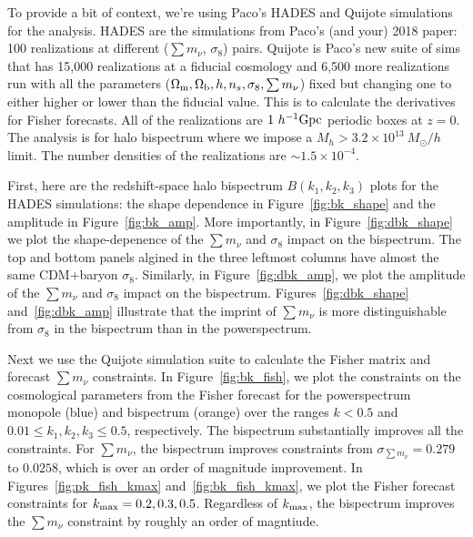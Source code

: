 \documentclass[12pt, letterpaper, preprint]{aastex62}
\newcommand{\Om}{\Omega_{\rm m}}
\newcommand{\Ob}{\Omega_{\rm b}}
\newcommand{\smnu}{\sum m_\nu}
\newcommand{\sig}{\sigma_8}
\begin{document}
\sloppy\sloppypar\frenchspacing 
To provide a bit of context, we’re using Paco’s HADES and Quijote simulations 
for the analysis. HADES are the simulations from Paco’s (and your) 2018 paper: 
100 realizations at different ($\smnu$, $\sig$) pairs. Quijote is Paco’s new 
suite of sims that has 15,000 realizations at a fiducial cosmology and 
6,500 more realizations run with all the parameters ($\Om, \Ob, h, n_s, \sig, \smnu$) 
fixed but changing one to either higher or lower than the fiducial value. This is 
to calculate the derivatives for Fisher forecasts. All of the realizations are 
$1~h^{-1}{\rm Gpc}$ periodic boxes at $z=0$. The analysis is for halo bispectrum 
where we impose a $M_h > 3.2\times10^13~M_\odot/h$ limit. The number densities of 
the realizations are $\sim 1.5\times10^{-4}$. 

First, here are the redshift-space halo bispectrum $B(k_1, k_2, k_3)$ 
plots for the HADES simulations: the shape dependence in 
Figure~\ref{fig:bk_shape} and the amplitude in Figure~\ref{fig:bk_amp}. 
More importantly, in Figure~\ref{fig:dbk_shape} we plot the 
shape-depenence of the $\smnu$ and $\sig$ impact on the bispectrum.
The top and bottom panels algined in the three leftmost columns have 
almost the same CDM+baryon $\sig$. Similarly, in Figure~\ref{fig:dbk_amp}, 
we plot the amplitude of the $\smnu$ and $\sig$ impact on the bispectrum.
Figures~\ref{fig:dbk_shape} and~\ref{fig:dbk_amp} illustrate that 
the imprint of $\smnu$ is more distinguishable from $\sig$ in the 
bispectrum than in the powerspectrum. 

Next we use the Quijote simulation suite to calculate the Fisher 
matrix and forecast $\smnu$ constraints. In Figure~\ref{fig:bk_fish}, 
we plot the constraints on the cosmological parameters from the Fisher 
forecast for the powerspectrum monopole (blue) and bispectrum (orange) 
over the ranges $k < 0.5$ and $0.01 \leq k_1, k_2, k_3 \leq 0.5$, 
respectively. The bispectrum substantially improves all the constraints. 
For $\smnu$, the bispectrum improves constraints from $\sigma_{\smnu} = 0.279$ 
to $0.0258$, which is over an order of magnitude improvement. In 
Figures~\ref{fig:pk_fish_kmax} and~\ref{fig:bk_fish_kmax}, we plot the 
Fisher forecast constraints for $k_{\rm max} = 0.2, 0.3, 0.5$. 
Regardless of $k_{\rm max}$, the bispectrum improves the $\smnu$ constraint 
by roughly an order of magntiude. 
\end{document}
